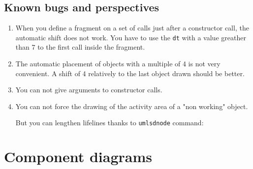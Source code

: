 \documentclass[a4paper,11pt]{report}
\begin{document}
\begin{center}
\end{center}

\section{Known bugs and perspectives}\label{s.seqbug}

\begin{enumerate}
\item When you define a fragment on a set of calls just after a constructor call, the automatic shift does not work. You have to use the {\tt dt} with a value greather than 7 to the first call inside the fragment.
\item The automatic placement of objects with a multiple of 4 is not very convenient. A shift of 4 relatively to the last object drawn should be better.
\item You can not give arguments to constructor calls.
\item You can not force the drawing of the activity area of a "non working" object.

\medskip

\begin{minipage}{0.3\textwidth}

\end{minipage}
\begin{minipage}{0.7\textwidth}
\begin{center}
\end{center}
\end{minipage}

But you can lengthen lifelines thanks to {\tt umlsdnode} command:

\medskip

\begin{minipage}{0.3\textwidth}

\end{minipage}
\begin{minipage}{0.7\textwidth}
\begin{center}
\end{center}
\end{minipage}

\end{enumerate}

\chapter{Component diagrams}
\end{document}
